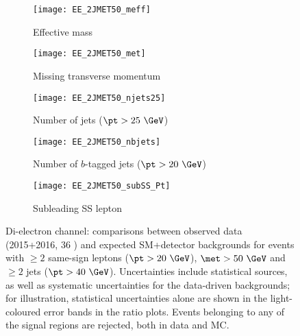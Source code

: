 
\begin{figure}[t!]
\centering
\begin{subfigure}[t]{0.48\textwidth}
\texttt{[image: EE\_2JMET50\_meff]}
\caption{Effective mass \meff}
\end{subfigure}
\begin{subfigure}[t]{0.48\textwidth}
\texttt{[image: EE\_2JMET50\_met]}
\caption{Missing transverse momentum \met}
\end{subfigure}
\begin{subfigure}[t]{0.48\textwidth}
\texttt{[image: EE\_2JMET50\_njets25]}
\caption{Number of jets ($\pt>25~\GeV$)}
\end{subfigure}
\begin{subfigure}[t]{0.48\textwidth}
\texttt{[image: EE\_2JMET50\_nbjets]}
\caption{Number of $b$-tagged jets ($\pt>20~\GeV$)}
\end{subfigure}
\begin{subfigure}[t]{0.48\textwidth}
\texttt{[image: EE\_2JMET50\_subSS\_Pt]}
\caption{Subleading SS lepton \pt}
\end{subfigure}
\caption{Di-electron channel: comparisons between observed data (2015+2016, 36 \ifb) and expected SM+detector backgrounds 
for events with $\ge 2$ same-sign leptons ($\pt>20~\GeV$), $\met>50~\GeV$ and $\ge 2$ jets ($\pt>40~\GeV$). 
Uncertainties include statistical sources, as well as systematic uncertainties for the data-driven backgrounds; 
for illustration, statistical uncertainties alone are shown in the light-coloured error bands in the ratio plots. 
Events belonging to any of the signal regions are rejected, both in data and MC. 
}
\label{fig:distributions_channelEE_2015}
\end{figure} 


